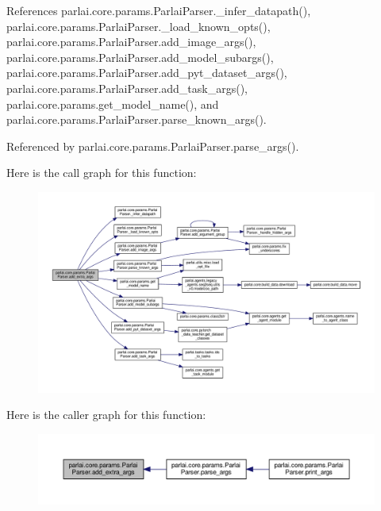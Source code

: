 References parlai.\+core.\+params.\+Parlai\+Parser.\+\_\+infer\+\_\+datapath(), parlai.\+core.\+params.\+Parlai\+Parser.\+\_\+load\+\_\+known\+\_\+opts(), parlai.\+core.\+params.\+Parlai\+Parser.\+add\+\_\+image\+\_\+args(), parlai.\+core.\+params.\+Parlai\+Parser.\+add\+\_\+model\+\_\+subargs(), parlai.\+core.\+params.\+Parlai\+Parser.\+add\+\_\+pyt\+\_\+dataset\+\_\+args(), parlai.\+core.\+params.\+Parlai\+Parser.\+add\+\_\+task\+\_\+args(), parlai.\+core.\+params.\+get\+\_\+model\+\_\+name(), and parlai.\+core.\+params.\+Parlai\+Parser.\+parse\+\_\+known\+\_\+args().



Referenced by parlai.\+core.\+params.\+Parlai\+Parser.\+parse\+\_\+args().

Here is the call graph for this function\+:
\nopagebreak
\begin{figure}[H]
\begin{center}
\leavevmode
\includegraphics[width=350pt]{classparlai_1_1core_1_1params_1_1ParlaiParser_ade9c068595c2b1110d019f3dedeb79ba_cgraph}
\end{center}
\end{figure}
Here is the caller graph for this function\+:
\nopagebreak
\begin{figure}[H]
\begin{center}
\leavevmode
\includegraphics[width=350pt]{classparlai_1_1core_1_1params_1_1ParlaiParser_ade9c068595c2b1110d019f3dedeb79ba_icgraph}
\end{center}
\end{figure}
\mbox{\label{classparlai_1_1core_1_1params_1_1ParlaiParser_a33d186a0cd665df88726b96f1bc3d88e}} 
